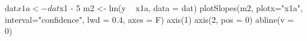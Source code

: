 \begin{Schunk}
\begin{Sinput}
 dat$x1a <- dat$x1 - 5
 m2 <- lm(y ~ x1a, data = dat)
 plotSlopes(m2, plotx="x1a", interval="confidence", lwd = 0.4, axes = F)
 axis(1)
 axis(2, pos = 0)
 abline(v = 0)
\end{Sinput}
\end{Schunk}
